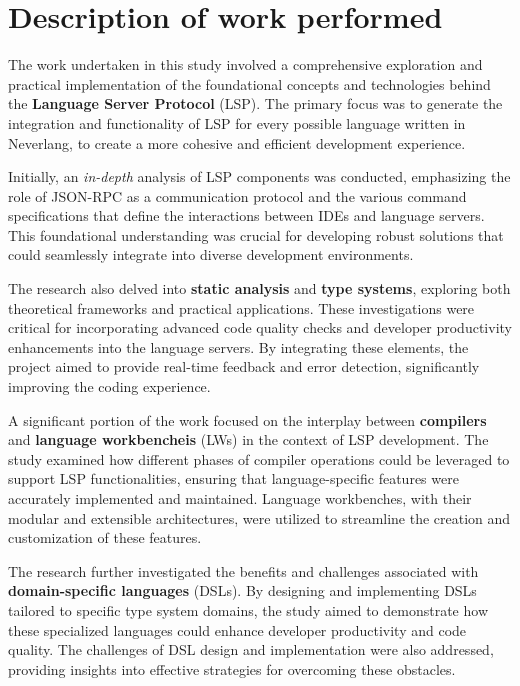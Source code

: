 \documentclass{adapt-lab}
\begin{document}
\section{Description of work performed}

The work undertaken in this study involved a comprehensive exploration and practical implementation of the foundational concepts and technologies behind the \textbf{Language Server Protocol} (LSP). The primary focus was to generate the integration and functionality of LSP for every possible language written in Neverlang, to create a more cohesive and efficient development experience.

Initially, an \textit{in-depth} analysis of LSP components was conducted, emphasizing the role of JSON-RPC as a communication protocol and the various command specifications that define the interactions between IDEs and language servers. This foundational understanding was crucial for developing robust solutions that could seamlessly integrate into diverse development environments.

The research also delved into \textbf{static analysis} and \textbf{type systems}, exploring both theoretical frameworks and practical applications. These investigations were critical for incorporating advanced code quality checks and developer productivity enhancements into the language servers. By integrating these elements, the project aimed to provide real-time feedback and error detection, significantly improving the coding experience.

A significant portion of the work focused on the interplay between \textbf{compilers} and \textbf{language workbencheis} (LWs) in the context of LSP development. The study examined how different phases of compiler operations could be leveraged to support LSP functionalities, ensuring that language-specific features were accurately implemented and maintained. Language workbenches, with their modular and extensible architectures, were utilized to streamline the creation and customization of these features.

The research further investigated the benefits and challenges associated with \textbf{domain-specific languages} (DSLs). By designing and implementing DSLs tailored to specific type system domains, the study aimed to demonstrate how these specialized languages could enhance developer productivity and code quality. The challenges of DSL design and implementation were also addressed, providing insights into effective strategies for overcoming these obstacles.
\end{document}
